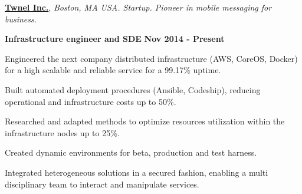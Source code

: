 \href{http://www.twnel.com/}{\textbf{Twnel Inc.}}, \textit{Boston, MA USA.
Startup.
Pioneer in mobile messaging for business.}
\begin{outerlist}
\item[] \textbf{Infrastructure engineer and SDE} \hfill \textbf{Nov 2014 -
Present}
    \begin{innerlist}
\item Engineered the next company distributed infrastructure (AWS, CoreOS,
Docker) for a high scalable and reliable service for a 99.17\% uptime.
\item Built automated deployment procedures (Ansible, Codeship), reducing
operational and infrastructure costs up to 50\%.
\item Researched and adapted methods to optimize resources utilization within
the infrastructure nodes up to 25\%.
\item Created dynamic environments for beta, production and test
harness.
\item Integrated heterogeneous solutions in a secured fashion, enabling a
multi disciplinary team to interact and manipulate services.
    \end{innerlist}
\end{outerlist}





%

% 

